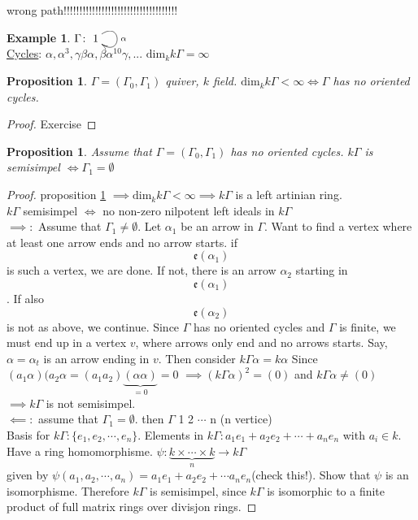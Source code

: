 \documentclass{amsart}
\numberwithin{equation}{section}
\newtheorem{prop}[thm]{Proposition}
\theoremstyle{definition}
\newtheorem{exam}[thm]{Example}
\newcommand{\G}{\Gamma}
\begin{document}
wrong path!!!!!!!!!!!!!!!!!!!!!!!!!!!!!!!!!!!! 
\begin{exam}
	$\G\colon \xymatrix{1\ar@(ur,dr)[]^\alpha}$\\ \newline
	\underline{Cycles}: $\alpha,\alpha^3,\gamma\beta\alpha,\beta\alpha^10\gamma, ...$  $\text{dim}_k k\G = \infty$ 
\end{exam}

\begin{prop}\label{prop1}
	$\G = (\G_0,\G_1)$ quiver, $k$ field. $\text{dim}_kk\G < \infty \iff \G$ has no oriented cycles.
\end{prop}

\begin{proof}
	Exercise
\end{proof}

\begin{prop}
	Assume that $\G=(\G_0,\G_1)$ has no oriented cycles. $k\G$ is semisimpel $\iff \G_1 = \emptyset$
\end{prop}

\begin{proof}
	proposition \ref{prop1} $ \implies \text{dim}_kk\G < \infty \implies k\G$ is a left artinian ring. \\
	$k\G$ semisimpel $\iff $ no non-zero nilpotent left ideals in $k\G$\\
	$\implies\colon$ Assume that $\G_1\neq\emptyset.$ Let $\alpha_1$ be an arrow in $\G$. Want to find a vertex where at least one arrow ends and no arrow starts. if \[\mathfrak{e}(\alpha_1)\] is such a vertex, we are done. If not, there is an arrow $\alpha_2$ starting in \[\mathfrak{e}(\alpha_1) \]. If also\[\mathfrak{e}(\alpha_2)\] is not as above, we continue. Since $\G$ has no oriented cycles and $\G$ is finite, we must end up in a vertex $ v$, where arrows only end and no arrows starts. Say, $\alpha = \alpha_t$ is an arrow ending in $v$. Then consider $k\G\alpha = k\alpha$ Since $(a_1\alpha)(a_2\alpha = (a_1a_2)\underbrace{(\alpha\alpha)}_{=0} = 0$ $\implies (k\G\alpha)^2=(0)$ and $k\G\alpha \neq (0)$\\
	$\implies k\G$ is not semisimpel.\\\newline
	$\impliedby\colon$ assume that $\G_1 = \emptyset$. then $\G$ 1 2 $\cdots$ n (n vertice)\\
	Basis for $k\G\colon \{e_1, e_2, \cdots, e_n\}$. Elements in $k\G\colon a_1e_1 + a_2e_2 + \cdots + a_ne_n$ with $a_i \in k$. Have a ring homomorphisme. $ \psi\colon \underbrace{k \times \cdots \times k}_{n}  \rightarrow k\G$\\
	given by $\psi(a_1,a_2,\cdots,a_n)=a_1e_1 + a_2e_2+ \cdots a_ne_n$(check this!). Show that $\psi$ is an isomorphisme. Therefore $k\G$ is semisimpel, since $k\G$ is isomorphic to a finite product of full matrix rings over divisjon rings.
\end{proof}
\end{document}
